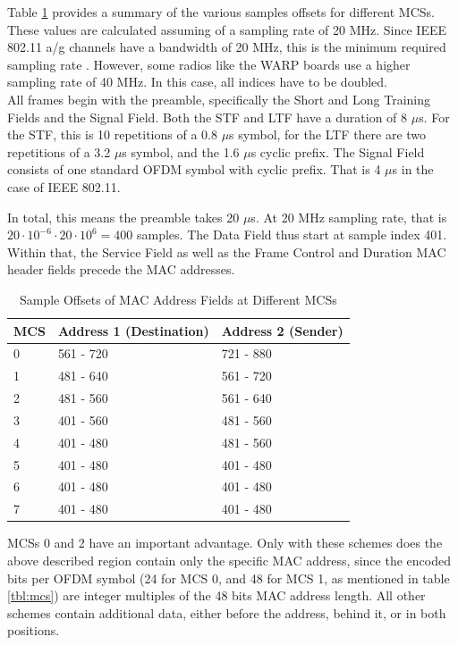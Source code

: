 Table \ref{tbl:sample-offsets} provides a summary of the various samples offsets for different \glspl{MCS}. These values are calculated assuming of a sampling rate of 20 MHz. Since IEEE 802.11 a/g channels have a bandwidth of 20 MHz, this is the minimum required sampling rate \cite{ieee2012}. However, some radios like the \gls{WARP} boards use a higher sampling rate of 40 MHz. In this case, all indices have to be doubled.\\

All frames begin with the preamble, specifically the Short and Long Training Fields and the Signal Field. Both the \gls{STF} and \gls{LTF} have a duration of 8 $\mu$s. For the \gls{STF}, this is 10 repetitions of a 0.8 $\mu$s symbol, for the \gls{LTF} there are two repetitions of a 3.2 $\mu$s symbol, and the 1.6 $\mu$s cyclic prefix. The Signal Field consists of one standard \gls{OFDM} symbol with cyclic prefix. That is 4 $\mu$s in the case of IEEE 802.11.

In total, this means the preamble takes 20 $\mu$s. At 20 MHz sampling rate, that is $ 20 \cdot 10^{-6} \cdot 20 \cdot 10^6 = 400 $ samples. The Data Field thus start at sample index 401. Within that, the Service Field as well as the Frame Control and Duration \gls{MAC} header fields precede the \gls{MAC} addresses.\\

\begin{table}[ht]
	\centering
	\begin{tabular}{|p{2.5cm}|p{4.5cm}|p{4.5cm}|}
		\hline
		\textbf{MCS} & \textbf{Address 1 (Destination)} & \textbf{Address 2 (Sender)} \\ \hline
		0 & 561 - 720 & 721 - 880 \\ \hline
		1 & 481 - 640 & 561 - 720 \\ \hline
		2 & 481 - 560 & 561 - 640 \\ \hline
		3 & 401 - 560 & 481 - 560 \\ \hline
		4 & 401 - 480 & 481 - 560 \\ \hline
		5 & 401 - 480 & 401 - 480 \\ \hline
		6 & 401 - 480 & 401 - 480 \\ \hline
		7 & 401 - 480 & 401 - 480 \\ \hline
	\end{tabular}
	\caption{Sample Offsets of MAC Address Fields at Different MCSs}
	\label{tbl:sample-offsets}
\end{table}

\glspl{MCS} 0 and 2 have an important advantage. Only with these schemes does the above described region contain only the specific \gls{MAC} address, since the encoded bits per \gls{OFDM} symbol (24 for \gls{MCS} 0, and 48 for \gls{MCS} 1, as mentioned in table \ref{tbl:mcs}) are integer multiples of the 48 bits \gls{MAC} address length. All other schemes contain additional data, either before the address, behind it, or in both positions.


